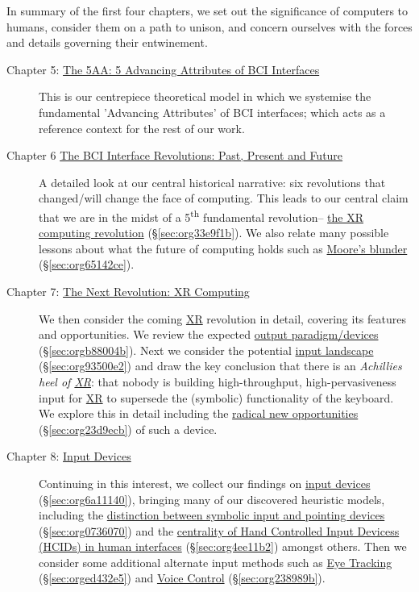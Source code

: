 \documentclass[logo,bsc,singlespacing,parskip]{infthesis}
\begin{document}
In summary of the first four chapters, we set out the significance of computers to humans, consider them on a path to unison, and concern ourselves with the forces and details governing their entwinement.

\begin{description}
\item[{Chapter 5: \hyperref[sec:org7f79682]{The 5AA: 5 Advancing Attributes of BCI Interfaces}}] This is our centrepiece theoretical model in which we systemise the fundamental 'Advancing Attributes' of BCI interfaces; which acts as a reference context for the rest of our work.

\item[{Chapter 6 \hyperref[sec:orgbbbb2de]{The BCI Interface Revolutions: Past, Present and Future}}] A detailed look at our central historical narrative: six revolutions that changed/will change the face of computing.
This leads to our central claim that we are in the midst of a 5\textsuperscript{th} fundamental revolution-- \hyperref[sec:org33e9f1b]{the XR computing revolution} (\S \ref{sec:org33e9f1b}).
We also relate many possible lessons about what the future of computing holds such as \hyperref[sec:org65142ce]{Moore's blunder} (\S \ref{sec:org65142ce}).

\item[{Chapter 7: \hyperref[sec:orgb165994]{The Next Revolution: XR Computing}}] We then consider the coming \hyperref[org39cbd51]{XR} revolution in detail, covering its features and opportunities.
We review the expected \hyperref[sec:orgb88004b]{output paradigm/devices} (\S \ref{sec:orgb88004b}).
Next we consider the potential \hyperref[sec:org93500e2]{input landscape} (\S \ref{sec:org93500e2}) and draw the key conclusion that there is an \emph{Achillies heel of \hyperref[org39cbd51]{XR}}: that nobody is building high-throughput, high-pervasiveness input for \hyperref[org39cbd51]{XR} to supersede the (symbolic) functionality of the keyboard.
We explore this in detail including the \hyperref[sec:org23d9ecb]{radical new opportunities} (\S \ref{sec:org23d9ecb}) of such a device.

\item[{Chapter 8: \hyperref[sec:org6a11140]{Input Devices}}] Continuing in this interest, we collect our findings on \hyperref[sec:org6a11140]{input devices} (\S \ref{sec:org6a11140}), bringing many of our discovered heuristic models, including the \hyperref[sec:org0736070]{distinction between symbolic input and pointing devices} (\S \ref{sec:org0736070}) and the \hyperref[sec:org4ee11b2]{centrality of Hand Controlled Input Devicess (HCIDs) in human interfaces} (\S \ref{sec:org4ee11b2}) amongst others.
Then we consider some additional alternate input methods such as \hyperref[sec:orged432e5]{Eye Tracking} (\S \ref{sec:orged432e5}) and \hyperref[sec:org238989b]{Voice Control} (\S \ref{sec:org238989b}).


\end{description}
\end{document}
